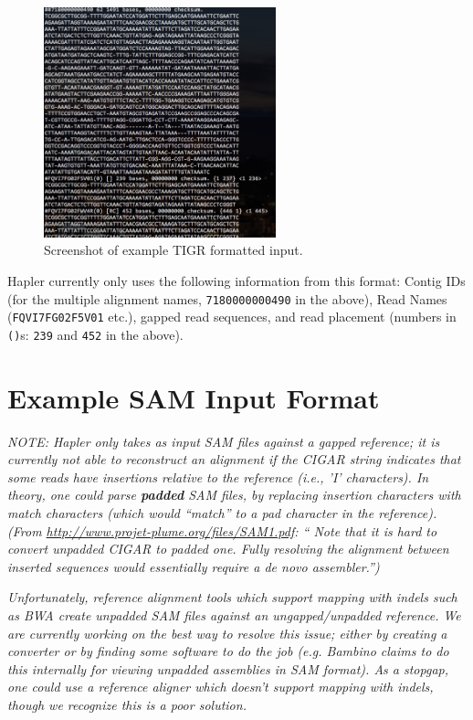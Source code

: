 \documentclass[11pt]{llncs}
\begin{document}
\begin{figure}[!h]
\centering
   \includegraphics[width=0.6\textwidth]{graphics/Example_tigr}
   \caption{Screenshot of example TIGR formatted input.}
   \label{exampleTIGR}
\end{figure}

Hapler currently only uses the following information from this format:  Contig IDs (for the multiple alignment names, \texttt{7180000000490} in the above),
Read Names (\texttt{FQVI7FG02F5V01} etc.), gapped read sequences, and read placement (numbers in \texttt{()}s: \texttt{239} and \texttt{452} in the above).

\newpage
\section{Example SAM Input Format}

\emph{NOTE: Hapler only takes as input SAM files against a gapped reference; it is currently not able to reconstruct an alignment if the CIGAR string indicates
that some reads have insertions relative to the reference (i.e., 'I' characters). In theory, one could parse \textbf{padded} SAM files, by replacing
insertion characters with match characters (which would ``match'' to a pad character in the reference). (From \url{http://www.projet-plume.org/files/SAM1.pdf}: ``
Note that it is hard to convert unpadded CIGAR to padded one. Fully resolving the alignment between inserted 
sequences would essentially require a  de novo assembler.'')}

\emph{Unfortunately, reference alignment tools which support mapping with indels such as BWA create unpadded SAM files against an ungapped/unpadded 
reference. We are currently working on the best way to resolve this issue; either by creating a converter or by finding some software to do the job (e.g.
Bambino claims to do this internally for viewing unpadded assemblies in SAM format). As a stopgap, one could use a reference aligner which doesn't support
mapping with indels, though we recognize this is a poor solution.}
\end{document}

